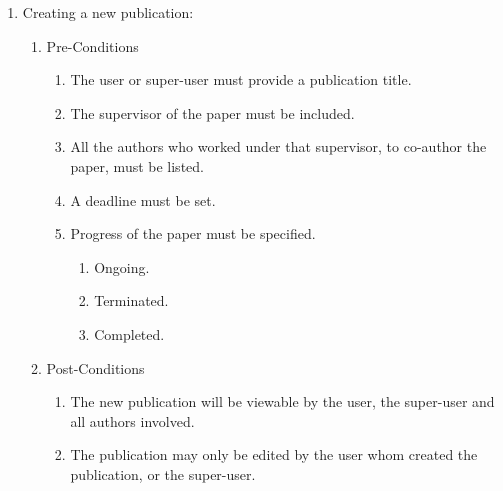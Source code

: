 \documentclass[hidelinks,a4paper,12pt]{article}
\begin{document}
	\noindent 
	
	\begin{enumerate}
		\item  Creating a new publication:
		
		\begin{enumerate}
			\item  Pre-Conditions
			
			\begin{enumerate}
				\item  The user or super-user must provide a publication title.
				
				\item  The supervisor of the paper must be included.
				
				\item  All the authors who worked under that supervisor, to co-author the paper, must be listed.
				
				\item  A deadline must be set.
				
				\item  Progress of the paper must be specified.
				
				\begin{enumerate}
					\item  Ongoing.
					
					\item  Terminated.
					
					\item  Completed.
				\end{enumerate}
			\end{enumerate}
			
			\item  Post-Conditions
			
			\begin{enumerate}
				\item  The new publication will be viewable by the user, the super-user and all authors involved.
				
				\item  The publication may only be edited by the user whom created the publication, or the super-user.
			\end{enumerate}
		\end{enumerate}
	\end{enumerate}
	
	\noindent  
	
\end{document}
